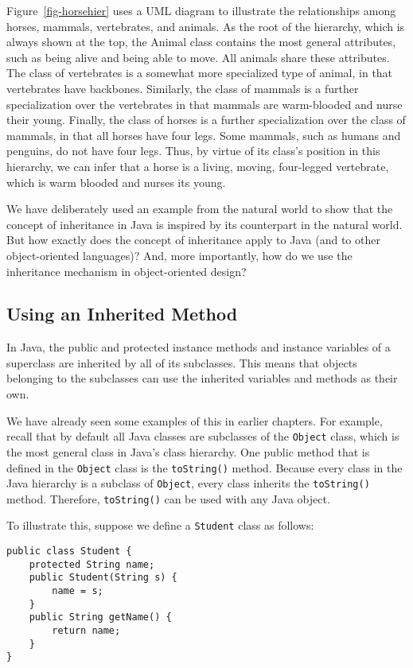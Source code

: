 Figure~\ref{fig-horsehier} uses a UML diagram to illustrate the relationships among
horses, mammals, vertebrates, and animals. As the root of the
hierarchy, which is always shown at the top, the Animal class contains
the most general attributes, such as being alive and being able to
move. All animals share these attributes. The class of vertebrates is
a somewhat more specialized type of animal, in that vertebrates have
backbones. Similarly, the class of mammals is a further specialization
over the vertebrates in that mammals are warm-blooded and nurse their
young.  Finally, the class of horses is a further specialization over
the class of mammals, in that all horses have four legs. Some mammals,
such as humans and penguins, do not have four legs.  Thus, by virtue
of its class's position in this hierarchy, we can infer that a horse
is a living, moving, four-legged vertebrate, which is warm blooded and
nurses its young.

We have deliberately used an example from the natural world to show
that the concept of inheritance in Java is inspired by its counterpart
in the natural world.  But how exactly does the concept of inheritance
apply to Java (and to other object-oriented languages)? And, more
importantly, how do we use the inheritance mechanism in
object-oriented design?

\subsection{Using an Inherited Method}

In Java, the public and protected instance methods and instance
variables of a superclass are inherited by all of its subclasses.
This means that objects belonging to the subclasses can use the
inherited variables and methods as their own.

We have already seen some examples of this in earlier chapters. For
example, recall that by default all Java classes are subclasses of the
{\tt Object} class, which is the most general class in Java's class hierarchy.
One public method that is defined in the {\tt Object} class is the
{\tt toString()} method.  Because every class in the Java hierarchy is
a subclass of {\tt Object}, every class inherits the {\tt toString()}
method.  Therefore, {\tt toString()} can be used with any Java object.

To illustrate this, suppose we define a {\tt Student} class as follows:

\begin{jjjlisting}
\begin{lstlisting}
public class Student {
    protected String name;
    public Student(String s) {
        name = s;
    }
    public String getName() {
        return name;
    }
}
\end{lstlisting}
\end{jjjlisting}


